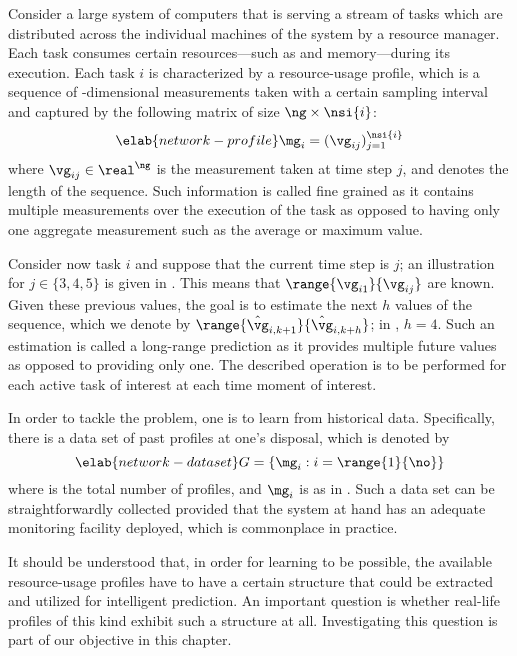 Consider a large system of computers that is serving a stream of tasks which are
distributed across the individual machines of the system by a resource manager.
Each task consumes certain resources---such as  and memory---during its
execution. Each task $i$ is characterized by a resource-usage profile, which is
a sequence of \ng-dimensional measurements taken with a certain sampling
interval and captured by the following matrix of size $\ng \times \nsi{i}$:
\begin{equation} \elab{network-profile}
  \mg_i = (\vg_{ij})_{j = 1}^\nsi{i}
\end{equation}
where $\vg_{ij} \in \real^\ng$ is the measurement taken at time step $j$, and
 denotes the length of the sequence. Such information is called
fine grained as it contains multiple measurements over the execution of the task
as opposed to having only one aggregate measurement such as the average or
maximum value.

Consider now task $i$ and suppose that the current time step is $j$; an
illustration for $j \in \{3, 4, 5\}$ is given in . This
means that $\range{\vg_{i1}}{\vg_{ij}}$ are known. Given these previous values,
the goal is to estimate the next $h$ values of the sequence, which we denote by
$\range{\hat{\vg}_{i,k + 1}}{\hat{\vg}_{i,k + h}}$; in ,
$h = 4$. Such an estimation is called a long-range prediction as it provides
multiple future values as opposed to providing only one. The described operation
is to be performed for each active task of interest at each time moment of
interest.

In order to tackle the problem, one is to learn from historical data.
Specifically, there is a data set of past profiles at one's disposal, which is
denoted by
\begin{equation} \elab{network-dataset}
  G = \left\{ \mg_i: i = \range{1}{\no} \right\}
\end{equation}
where \no is the total number of profiles, and $\mg_i$ is as in
. Such a data set can be straightforwardly collected
provided that the system at hand has an adequate monitoring facility deployed,
which is commonplace in practice.

It should be understood that, in order for learning to be possible, the
available resource-usage profiles have to have a certain structure that could be
extracted and utilized for intelligent prediction. An important question is
whether real-life profiles of this kind exhibit such a structure at all.
Investigating this question is part of our objective in this chapter.
